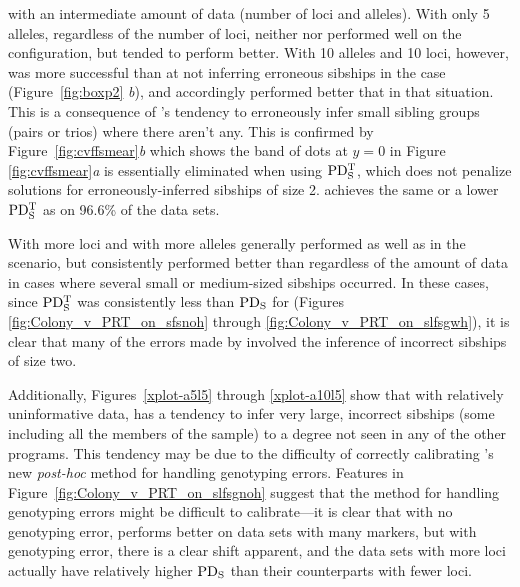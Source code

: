 with an intermediate amount of data (number of loci and alleles). With only 5 alleles, regardless of 
the number of loci, neither \colony{} nor \prt{} performed well on the \nosibs{} configuration, but 
\colony{} tended to perform better.  With 10 alleles and 10 loci, however, \prt{} was more successful 
than \colony{} at not inferring erroneous sibships in the \nosibs{} case (Figure~\ref{fig:boxp2}{\em 
b}), and accordingly performed better that \colony{} in that situation.   This is a consequence of 
\colony{}'s tendency to erroneously infer small sibling groups (pairs or trios) where there aren't any.  
This is confirmed by Figure~\ref{fig:cvffsmear}{\em b} which shows the band of dots at $y=0$ in Figure~
\ref{fig:cvffsmear}{\em a} is essentially eliminated when using $\mathrm{PD_S^T}$, which does not penalize 
solutions for erroneously-inferred sibships of size 2. \colony{} achieves the same or a lower $\mathrm{PD_S^T}$ 
as \prt{} on 96.6\% of the data sets.   

With more loci and with more alleles \colony{} generally performed as well as \prt{} in the \nosibs{} 
scenario, but consistently performed better than \prt{} regardless of the amount of data in cases where 
several small or medium-sized sibships occurred.  In these cases, since $\mathrm{PD_S^T}$ was consistently less 
than $\mathrm{PD_S}$ for \prt{} (Figures \ref{fig:Colony_v_PRT_on_sfsnoh} through 
\ref{fig:Colony_v_PRT_on_slfsgwh}), it is clear that many of the errors made by \prt{} involved the 
inference of incorrect sibships of size two. 

Additionally, Figures~\ref{xplot-a5l5} through \ref{xplot-a10l5} show that with relatively 
uninformative data, \prt{} has a tendency to infer very large, incorrect sibships (some including all 
the members of the sample) to a degree not seen in any of the other programs. This tendency may be due 
to the difficulty of correctly calibrating \prt{}'s new {\em post-hoc} method for handling genotyping 
errors.  Features in Figure~\ref{fig:Colony_v_PRT_on_slfsgnoh} suggest that the method for handling 
genotyping errors might be difficult to calibrate---it is clear that with no genotyping error, \prt{} 
performs better on data sets with many markers, but with genotyping error, there is a clear shift 
apparent, and the data sets with more loci actually  have relatively higher $\mathrm{PD_S}$ than their 
counterparts with fewer loci. 




